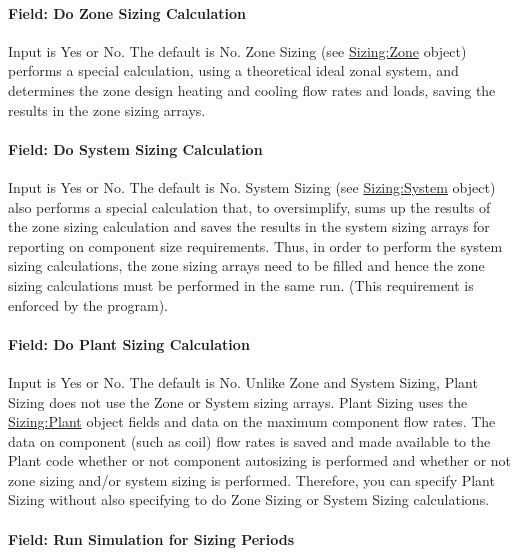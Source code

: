 \paragraph{Field: Do Zone Sizing Calculation}\label{field-do-zone-sizing-calculation}

Input is Yes or No. The default is No. Zone Sizing (see \hyperref[sizingzone]{Sizing:Zone} object) performs a special calculation, using a theoretical ideal zonal system, and determines the zone design heating and cooling flow rates and loads, saving the results in the zone sizing arrays.

\paragraph{Field: Do System Sizing Calculation}\label{field-do-system-sizing-calculation}

Input is Yes or No. The default is No. System Sizing (see \hyperref[sizingsystem]{Sizing:System} object) also performs a special calculation that, to oversimplify, sums up the results of the zone sizing calculation and saves the results in the system sizing arrays for reporting on component size requirements. Thus, in order to perform the system sizing calculations, the zone sizing arrays need to be filled and hence the zone sizing calculations must be performed in the same run. (This requirement is enforced by the program).

\paragraph{Field: Do Plant Sizing Calculation}\label{field-do-plant-sizing-calculation}

Input is Yes or No. The default is No. Unlike Zone and System Sizing, Plant Sizing does not use the Zone or System sizing arrays. Plant Sizing uses the \hyperref[sizingplant]{Sizing:Plant} object fields and data on the maximum component flow rates. The data on component (such as coil) flow rates is saved and made available to the Plant code whether or not component autosizing is performed and whether or not zone sizing and/or system sizing is performed. Therefore, you can specify Plant Sizing without also specifying to do Zone Sizing or System Sizing calculations.

\paragraph{Field: Run Simulation for Sizing Periods}\label{field-run-simulation-for-sizing-periods}

